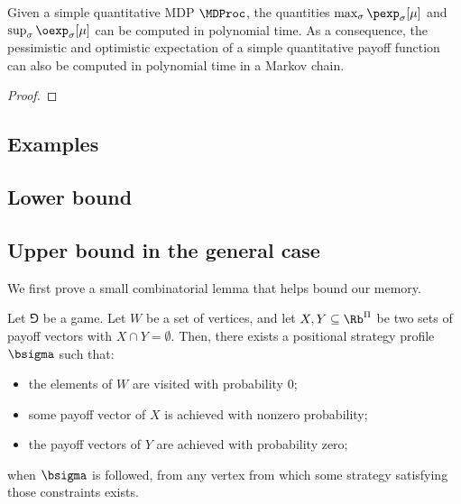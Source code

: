 
\begin{lemma} \label{lm:mpd_ptime}
    Given a simple quantitative MDP $\MDProc$, the quantities $\max_\sigma \pexp_\sigma[\mu]$ and $\sup_\sigma \oexp_\sigma[\mu]$ can be computed in polynomial time.
    As a consequence, the pessimistic and optimistic expectation of a simple quantitative payoff function can also be computed in polynomial time in a Markov chain.
\end{lemma}

\begin{proof}
\end{proof}



\subsection{Examples}



\subsection{Lower bound}






\subsection{Upper bound in the general case}
We first prove a small combinatorial lemma that helps bound our memory. 







\begin{lemma}\label{lm:reach_safe_positional}
    Let $\Game$ be a game.
    Let $W$ be a set of vertices, and let $X, Y \subseteq \Rb^\Pi$ be two sets of payoff vectors with $X \cap Y = \emptyset$.
    Then, there exists a positional strategy profile $\bsigma$ such that:
    \begin{itemize}
        \item the elements of $W$ are visited with probability $0$;
        \item some payoff vector of $X$ is achieved with nonzero probability;
        \item the payoff vectors of $Y$ are achieved with probability zero;
    \end{itemize}
    when $\bsigma$ is followed, from any vertex from which some strategy satisfying those constraints exists.
\end{lemma}

